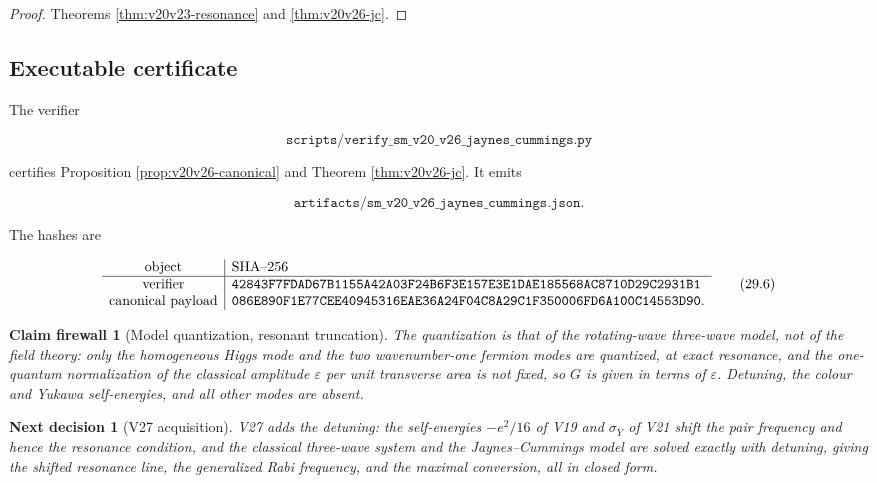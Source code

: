 \documentclass[11pt]{article}
\newtheorem{firewall}[theorem]{Claim firewall}
\newtheorem{decision}[theorem]{Next decision}
\theoremstyle{remark}
\begin{document}
\begin{proof}
Theorems \ref{thm:v20v23-resonance} and \ref{thm:v20v26-jc}.
\end{proof}

\subsection{Executable certificate}

The verifier

\[
 \texttt{scripts/verify\_sm\_v20\_v26\_jaynes\_cummings.py}           \tag{29.4}
\]

certifies Proposition \ref{prop:v20v26-canonical} and Theorem
\ref{thm:v20v26-jc}.  It emits

\[
 \texttt{artifacts/sm\_v20\_v26\_jaynes\_cummings.json}.              \tag{29.5}
\]

The hashes are

\[
\begin{array}{c|l}
\hbox{object}&\hbox{SHA--256}\\ \hline
\hbox{verifier}&
\texttt{42843F7FDAD67B1155A42A03F24B6F3E157E3E1DAE185568AC8710D29C2931B1}\\
\hbox{canonical payload}&
\texttt{086E890F1E77CEE40945316EAE36A24F04C8A29C1F350006FD6A100C14553D90}.
\end{array}                                                     \tag{29.6}
\]

\begin{firewall}[Model quantization, resonant truncation]
\label{fire:v20v26}
The quantization is that of the rotating-wave three-wave model, not
of the field theory: only the homogeneous Higgs mode and the two
wavenumber-one fermion modes are quantized, at exact resonance, and
the one-quantum normalization of the classical amplitude
\(\varepsilon\) per unit transverse area is not fixed, so \(G\) is
given in terms of \(\varepsilon\).  Detuning, the colour and Yukawa
self-energies, and all other modes are absent.
\end{firewall}

\begin{decision}[V27 acquisition]
\label{dec:v20v26-next}
V27 adds the detuning: the self-energies \(-e^2/16\) of V19 and
\(\sigma_Y\) of V21 shift the pair frequency and hence the resonance
condition, and the classical three-wave system and the
Jaynes--Cummings model are solved exactly with detuning, giving the
shifted resonance line, the generalized Rabi frequency, and the
maximal conversion, all in closed form.
\end{decision}
\end{document}
